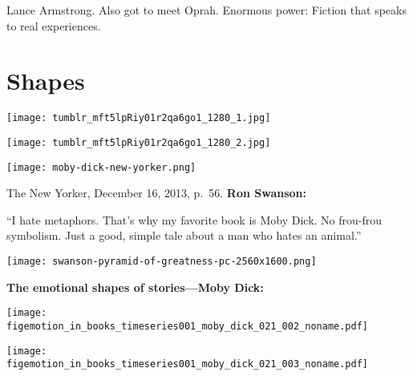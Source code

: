         Lance Armstrong.
        {
          Also got to meet Oprah.
        }
      Enormous power: Fiction that speaks to real experiences.
\section{Shapes}

  \textbf{}
\begin{marginfigure}
  \texttt{[image: tumblr\_mft5lpRiy01r2qa6go1\_1280\_1.jpg]}
\end{marginfigure}
  \textbf{}
\begin{marginfigure}
  \texttt{[image: tumblr\_mft5lpRiy01r2qa6go1\_1280\_2.jpg]}
\end{marginfigure}
\begin{marginfigure}
  \texttt{[image: moby-dick-new-yorker.png]}
\end{marginfigure}
  {\small
    The New Yorker,
    December 16, 2013, p.\ 56.}
  \textbf{Ron Swanson:}
    
    ``I hate metaphors. 
    {
      That's why my favorite book is Moby Dick. 
    }
    {
    No frou-frou symbolism. 
    }
    {
    Just a good, simple tale about a man who hates an animal.''
    }
  
  
\begin{marginfigure}
  \texttt{[image: swanson-pyramid-of-greatness-pc-2560x1600.png]}
\end{marginfigure}

  \textbf{The emotional shapes of stories---Moby Dick:}
      
\begin{marginfigure}
  \texttt{[image: figemotion\_in\_books\_timeseries001\_moby\_dick\_021\_002\_noname.pdf]}
\end{marginfigure}

      
\begin{marginfigure}
  \texttt{[image: figemotion\_in\_books\_timeseries001\_moby\_dick\_021\_003\_noname.pdf]}
\end{marginfigure}

